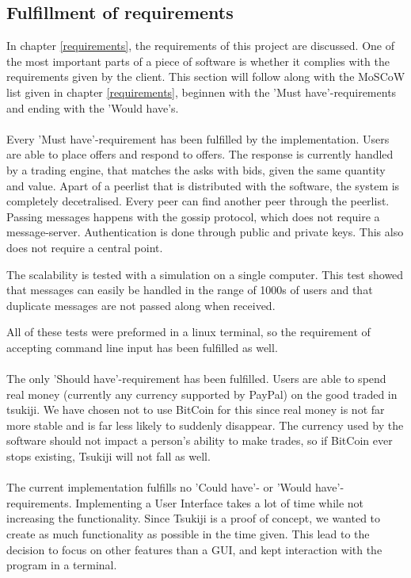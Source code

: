 \subsection{Fulfillment of requirements}
\label{requirementsfill}
In chapter \ref{requirements}, the requirements of this project are discussed. 
One of the most important parts of a piece of software is whether it complies with the requirements given by the client.
This section will follow along with the MoSCoW list given in chapter \ref{requirements}, beginnen with the 'Must have'-requirements and ending with the 'Would have's. \\
\\
Every 'Must have'-requirement has been fulfilled by the implementation.
Users are able to place offers and respond to offers. 
The response is currently handled by a trading engine, that matches the asks with bids, given the same quantity and value.
Apart of a peerlist that is distributed with the software, the system is completely decetralised. 
Every peer can find another peer through the peerlist.
Passing messages happens with the gossip protocol, which does not require a message-server.
Authentication is done through public and private keys.
This also does not require a central point.

The scalability is tested with a simulation on a single computer.
This test showed that messages can easily be handled in the range of 1000s of users and that duplicate messages are not passed along when received.

All of these tests were preformed in a linux terminal, so the requirement of accepting command line input has been fulfilled as well.\\
\\
The only 'Should have'-requirement has been fulfilled.
Users are able to spend real money (currently any currency supported by PayPal) on the good traded in tsukiji.
We have chosen not to use BitCoin for this since real money is not far more stable and is far less likely to suddenly disappear. 
The currency used by the software should not impact a person's ability to make trades, so if BitCoin ever stops existing, Tsukiji will not fall as well.\\
\\
The current implementation fulfills no 'Could have'- or 'Would have'-requirements.
Implementing a User Interface takes a lot of time while not increasing the functionality.
Since Tsukiji is a proof of concept, we wanted to create as much functionality as possible in the time given.
This lead to the decision to focus on other features than a GUI, and kept interaction with the program in a terminal.

